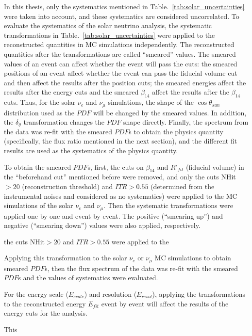 In this thesis, only the systematics mentioned in Table.~\ref{tab:solar_uncertainties} were taken into account, and these systematics are considered uncorrelated. To evaluate the systematics of the solar neutrino analysis, the systematic transformations in Table.~\ref{tab:solar_uncertainties} were applied to the reconstructed quantities in MC simulations independently. The reconstructed quantities after the transformations are called ``smeared'' values. The smeared values of an event can affect whether the event will pass the cuts: the smeared positions of an event affect whether the event can pass the fiducial volume cut and then affect the results after the position cuts; the smeared energies affect the results after the energy cuts and the smeared $\beta_{14}$ affect the results after the $\beta_{14}$ cuts. Thus, for the solar $\nu_e$ and $\nu_\mu$ simulations, the shape of the $\cos\theta_{sun}$ distribution used as the $PDF$ will be changed by the smeared values. In addition, the $\delta_\theta$ transformation changes the $PDF$ shape directly. Finally, the spectrum from the data was re-fit with the smeared $PDF$s to obtain the physics quantity (specifically, the flux ratio mentioned in the next section), and the different fit results are used as the systematics of the physics quantity.

To obtain the smeared $PDF$s, first, the cuts on $\beta_{14}$ and $R'_{fit}$ (fiducial volume) in the ``beforehand cut'' mentioned before were removed, and only the cuts NHit$>20$ (reconstruction threshold) and $ITR>0.55$ (determined from the instrumental noises and considered as no systematics) were applied to the MC simulations of the solar $\nu_e$ and $\nu_\mu$. Then the systematic transformations were applied one by one and event by event. The positive (``smearing up'') and negative (``smearing down'') values were also applied, respectively.


the cuts NHit$>20$ and $ITR>0.55$ were applied to the 

Applying this transformation to the solar $\nu_e$ or $\nu_\mu$ MC simulations to obtain smeared $PDF$s, then the flux spectrum of the data was re-fit with the smeared $PDF$s and the values of systematics were evaluated.

For the energy scale ($E_{scale}$) and resolution ($E_{resol}$), applying the transformations to the reconstructed energy $E_{fit}$ event by event will affect the results of the energy cuts for the analysis.

This 


